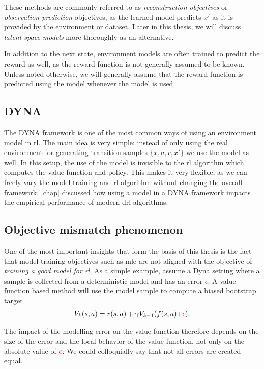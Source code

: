These methods are commonly referred to as \emph{reconstruction objectives} or \emph{observation prediction} objectives, as the learned model predicts $x'$ as it is provided by the environment or dataset.
Later in this thesis, we will discuss \emph{latent space models} more thoroughly as an alternative.

In addition to the next state, environment models are often trained to predict the reward as well, as the reward function is not generally assumed to be known.
Unless noted otherwise, we will generally assume that the reward function is predicted using the model whenever the model is used.

\subsection{DYNA}

The DYNA framework \cite{dyna} is one of the most common ways of using an environment model in \ac{rl}.
The main idea is very simple: instead of only using the real environment for generating transition samples $\{x,a,r,x'\}$ we use the model as well.
In this setup, the use of the model is invisible to the \ac{rl} algorithm which computes the value function and policy.
This makes it very flexible, as we can freely vary the model training and \ac{rl} algorithm without changing the overall framework.
\autoref{chap} discussed how using a model in a DYNA framework impacts the empirical performance of modern \ac{drl} algorithms.


\subsection{Objective mismatch phenomenon}

One of the most important insights that form the basis of this thesis is the fact that model training objectives such as \ac{mle} are not aligned with the objective of \emph{training a good model for \ac{rl}}.
As a simple example, assume a Dyna setting where a sample is collected from a deterministic model and has an error $\epsilon$.
A value function based method will use the model sample to compute a biased bootstrap target
\begin{align}
    V_k(s,a) = r(s,a) + \gamma V_{k-1}(f(s, a) {\color{red} + \epsilon}).
\end{align}

The impact of the modelling error on the value function therefore depends on the size of the error and the local behavior of the value function, not only on the absolute value of ${\color{red}\epsilon}$. 
We could colloquially say that not all errors are created equal.

